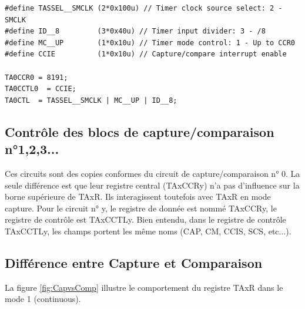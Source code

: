 \lstset{style=customc}
\begin{lstlisting}
#define TASSEL__SMCLK (2*0x100u) // Timer clock source select: 2 - SMCLK
#define ID__8         (3*0x40u) // Timer input divider: 3 - /8
#define MC__UP        (1*0x10u) // Timer mode control: 1 - Up to CCR0
#define CCIE          (1*0x10u) // Capture/compare interrupt enable

TA0CCR0 = 8191;
TA0CCTL0  = CCIE;
TA0CTL  = TASSEL__SMCLK | MC__UP | ID__8;
\end{lstlisting}

\subsection{Contrôle des blocs de capture/comparaison n°1,2,3...}
Ces circuits sont des copies conformes du circuit de capture/comparaison n° 0. La seule différence est que leur registre central (TAxCCRy) n'a pas d'influence sur la borne supérieure de TAxR. Ils interagissent toutefois avec TAxR en mode capture.
Pour le circuit n° y, le registre de donnée est nommé TAxCCRy, le registre de contrôle est TAxCCTLy.
Bien entendu, dans le registre de contrôle TAxCCTLy, les champs portent les même noms (CAP, CM, CCIS, SCS, etc...).

\subsection{Différence entre Capture et Comparaison}
La figure \ref{fig:CapvsComp} illustre le comportement du registre TAxR dans le mode 1 (continuous).

